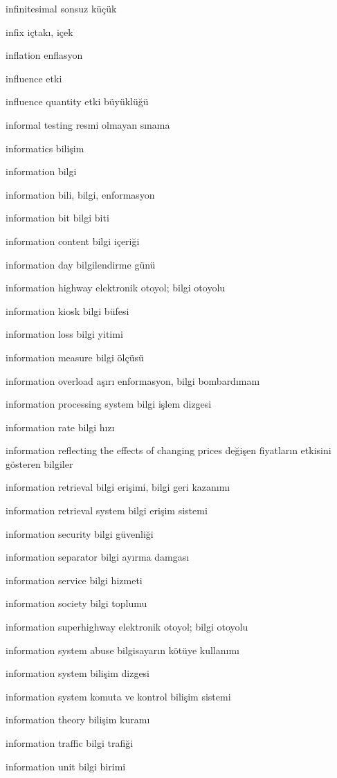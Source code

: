 \documentclass[12pt,fleqn]{article}\usepackage{../../common}
\begin{document}
infinitesimal sonsuz küçük

infix içtakı, içek

inflation enflasyon

influence etki

influence quantity etki büyüklüğü

informal testing resmi olmayan sınama

informatics bilişim

information bilgi

information bili, bilgi, enformasyon

information bit bilgi biti

information content bilgi içeriği

information day bilgilendirme günü

information highway elektronik otoyol; bilgi otoyolu

information kiosk bilgi büfesi

information loss bilgi yitimi

information measure bilgi ölçüsü

information overload aşırı enformasyon, bilgi bombardımanı

information processing system bilgi işlem dizgesi

information rate bilgi hızı

information reflecting the effects of changing prices değişen fiyatların etkisini gösteren bilgiler

information retrieval bilgi erişimi, bilgi geri kazanımı

information retrieval system bilgi erişim sistemi

information security bilgi güvenliği

information separator bilgi ayırma damgası

information service bilgi hizmeti

information society bilgi toplumu

information superhighway elektronik otoyol; bilgi otoyolu

information system abuse bilgisayarın kötüye kullanımı

information system bilişim dizgesi

information system komuta ve kontrol bilişim sistemi

information theory bilişim kuramı

information traffic bilgi trafiği

information unit bilgi birimi
\end{document}
